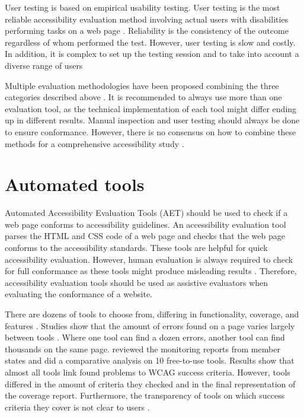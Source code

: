 User testing is based on empirical usability testing. User testing is the most reliable accessibility evaluation method involving actual users with disabilities performing tasks on a web page \citep[Chapter~26.2]{webaccessibility}. Reliability is the consistency of the outcome regardless of whom performed the test. However, user testing is slow and costly. In addition, it is complex to set up the testing session and to take into account a diverse range of users \citep{comparative_accessibility_methods}

Multiple evaluation methodologies have been proposed combining the three categories described above \citep[Chapter~26.2.1]{webaccessibility}. It is recommended to always use more than one evaluation tool, as the technical implementation of each tool might differ ending up in different results. Manual inspection and user testing should always be done to ensure conformance. However, there is no consensus on how to combine these methods for a comprehensive accessibility study \citep[Chapter~26.2.1]{webaccessibility}.

\section{Automated tools\label{automated_tools}}

Automated Accessibility Evaluation Tools (AET) should be used to check if a web page conforms to accessibility guidelines. An accessibility evaluation tool parses the HTML and CSS code of a web page and checks that the web page conforms to the accessibility standards. These tools are helpful for quick accessibility evaluation. However, human evaluation is always required to check for full conformance as these tools might produce misleading results \citep{wcagevaluationtools}. Therefore, accessibility evaluation tools should be used as assistive evaluators when evaluating the conformance of a website.

There are dozens of tools to choose from, differing in functionality, coverage, and features \citep{tool_list}. Studies show that the amount of errors found on a page varies largely between tools \citep{comparison_10.1145/3371300.3383346, comparison_10.1145/3607720.3607722, tool_analysis_directive}. Where one tool can find a dozen errors, another tool can find thousands on the same page. \textcite{tool_analysis_directive} reviewed the monitoring reports from member states and did a comparative analysis on 10 free-to-use tools. Results show that almost all tools link found problems to WCAG success criteria. However, tools differed in the amount of criteria they checked and in the final representation of the coverage report. Furthermore, the transparency of tools on which success criteria they cover is not clear to users \citep{tool_analysis_directive}.

